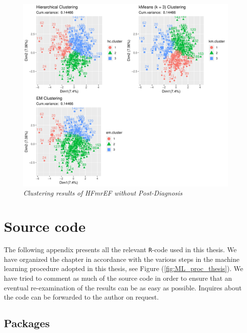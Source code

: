 \documentclass[../thesis.tex]{subfiles}
\begin{document}
\newpage

\begin{figure}[h!]
    \centering
    \hspace*{-1cm}\includegraphics[width=1.1\textwidth]{doc/thesis/images/ClustmrNoPhy.pdf}
    \caption[HFmrEF without Post-Diagnosis]{\textit{Clustering results of HFmrEF \textit{without} Post-Diagnosis}}
    \label{fig:clust_results_without_post_mr}
\end{figure}

\chapter{Source code}
\label{chap:souce_code}

\noindent The following appendix presents all the relevant \texttt{R}-code used in this thesis. We have organized the chapter in accordance with the various steps in the machine learning procedure adopted in this thesis, see Figure (\ref{fig:ML_proc_thesis}). We have tried to comment as much of the source code in order to ensure that an eventual re-examination of the results can be as easy as possible. Inquires about the code can be forwarded to the author on request.

\section{Packages}
\label{sec:pack_code}
\end{document}
